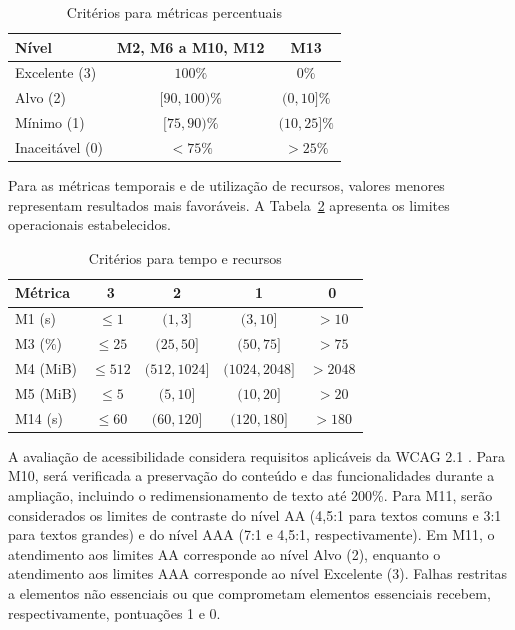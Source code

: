 \documentclass[sigconf, language=english, language=brazilian,natbib=false]{acmart}
\begin{document}
\begin{table}[htbp]
\centering
\caption{Critérios para métricas percentuais}
\label{tab:criterios-percentuais}
\small
\begin{tabular}{lcc}
\hline
\textbf{Nível} &
\textbf{M2, M6 a M10, M12} &
\textbf{M13} \\
\hline
Excelente (3) & $100\%$ & $0\%$ \\
Alvo (2) & $[90,100)\%$ & $(0,10]\%$ \\
Mínimo (1) & $[75,90)\%$ & $(10,25]\%$ \\
Inaceitável (0) & $<75\%$ & $>25\%$ \\
\hline
\end{tabular}
\end{table}

Para as métricas temporais e de utilização de recursos,
valores menores representam resultados mais favoráveis.
A Tabela~\ref{tab:criterios-recursos} apresenta os
limites operacionais estabelecidos.


\begin{table}[t]
\centering
\caption{Critérios para tempo e recursos}
\label{tab:criterios-recursos}
\scriptsize
\setlength{\tabcolsep}{3pt}
\begin{tabular}{lcccc}
\hline
\textbf{Métrica} & \textbf{3} & \textbf{2} &
\textbf{1} & \textbf{0} \\
\hline
M1 (s) & $\leq1$ & $(1,3]$ & $(3,10]$ & $>10$ \\
M3 (\%) & $\leq25$ & $(25,50]$ &
$(50,75]$ & $>75$ \\
M4 (MiB) & $\leq512$ & $(512,1024]$ &
$(1024,2048]$ & $>2048$ \\
M5 (MiB) & $\leq5$ & $(5,10]$ &
$(10,20]$ & $>20$ \\
M14 (s) & $\leq60$ & $(60,120]$ &
$(120,180]$ & $>180$ \\
\hline
\end{tabular}
\end{table}


A avaliação de acessibilidade considera requisitos
aplicáveis da WCAG 2.1 \cite{wcag21}. Para M10, será verificada a
preservação do conteúdo e das funcionalidades durante
a ampliação, incluindo o redimensionamento de texto
até 200\%. Para M11, serão considerados os limites
de contraste do nível AA (4,5:1 para textos comuns
e 3:1 para textos grandes) e do nível AAA
(7:1 e 4,5:1, respectivamente). Em M11, o
atendimento aos limites AA corresponde ao nível
Alvo (2), enquanto o atendimento aos limites AAA
corresponde ao nível Excelente (3). Falhas restritas
a elementos não essenciais ou que comprometam
elementos essenciais recebem, respectivamente,
pontuações 1 e 0.
\end{document}
